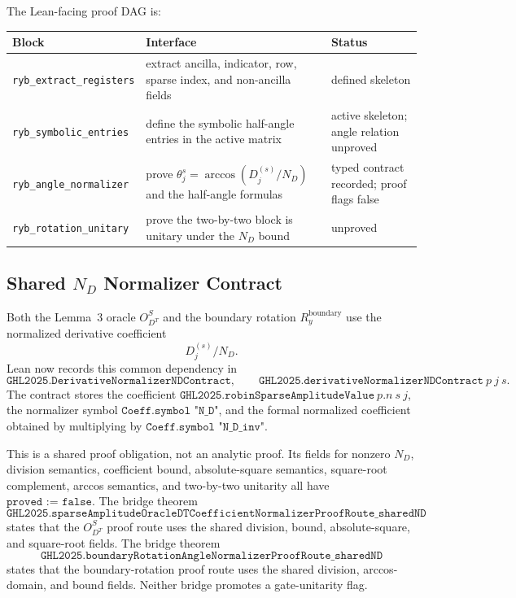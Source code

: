 The Lean-facing proof DAG is:
\begin{center}
\begin{tabular}{p{}p{}p{}}
\hline
Block & Interface & Status \\
\hline
\texttt{ryb\_extract\_registers} &
extract ancilla, indicator, row, sparse index, and non-ancilla fields &
defined skeleton \\
\texttt{ryb\_symbolic\_entries} &
define the symbolic half-angle entries in the active matrix &
active skeleton; angle relation unproved \\
\texttt{ryb\_angle\_normalizer} &
prove \(\theta_j^s=\arccos(D_j^{(s)}/N_D)\) and the half-angle formulas &
typed contract recorded; proof flags false \\
\texttt{ryb\_rotation\_unitary} &
prove the two-by-two block is unitary under the \(N_D\) bound &
unproved \\
\hline
\end{tabular}
\end{center}

\subsection{Shared \(N_D\) Normalizer Contract}

Both the Lemma~3 oracle \(O_{D^T}^S\) and the boundary rotation
\(R_y^{\mathrm{boundary}}\) use the normalized derivative coefficient
\[
  D_j^{(s)}/N_D.
\]
Lean now records this common dependency in
\[
  \texttt{GHL2025.DerivativeNormalizerNDContract},
  \qquad
  \texttt{GHL2025.derivativeNormalizerNDContract}\ p\ j\ s.
\]
The contract stores the coefficient
\(\texttt{GHL2025.robinSparseAmplitudeValue}\ p.n\ s\ j\), the normalizer
symbol \(\texttt{Coeff.symbol "N\_D"}\), and the formal normalized coefficient
obtained by multiplying by \(\texttt{Coeff.symbol "N\_D\_inv"}\).

This is a shared proof obligation, not an analytic proof.  Its fields for
nonzero \(N_D\), division semantics, coefficient bound, absolute-square
semantics, square-root complement, arccos semantics, and two-by-two unitarity
all have \(\texttt{proved := false}\).  The bridge theorem
\[
  \texttt{GHL2025.sparseAmplitudeOracleDTCoefficientNormalizerProofRoute\_sharedND}
\]
states that the \(O_{D^T}^S\) proof route uses the shared division, bound,
absolute-square, and square-root fields.  The bridge theorem
\[
  \texttt{GHL2025.boundaryRotationAngleNormalizerProofRoute\_sharedND}
\]
states that the boundary-rotation proof route uses the shared division,
arccos-domain, and bound fields.  Neither bridge promotes a gate-unitarity
flag.

